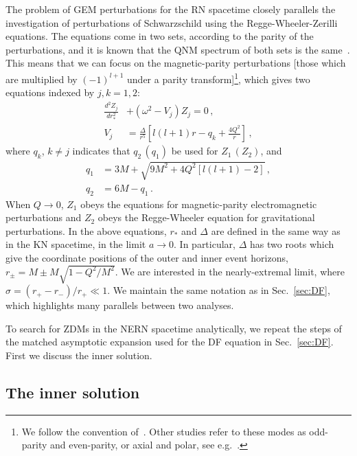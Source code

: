\begin{refsection}
The problem of GEM perturbations for the RN spacetime closely parallels the investigation of perturbations of Schwarzschild using the Regge-Wheeler-Zerilli equations. 
The equations come in two sets, according to the parity of the perturbations, and it is known that the QNM spectrum of both sets is the same~\cite{ChandraBook,Dias:2015wqa}. 
This means that we can focus on the magnetic-parity perturbations [those which are multiplied by $(-1)^{l+1}$ under a parity transform]\footnote{We follow the convention of~\cite{Zerilli:1970wd}. Other studies refer to these modes as odd-parity and even-parity, or axial and polar, see e.g.~\cite{Pani:2013ija,Pani:2013wsa}.}, which gives two equations indexed by $j,k = 1,2$:
\begin{align}
\label{eq:RNwave}
\frac{d^2 Z_j}{dr_*^2}& + (\omega^2 - V_j) Z_j = 0 \,, \\
\label{eq:RNpot}
V_j & = \frac{\Delta}{r^5}\left[ l(l+1) r - q_k +\frac{4 Q^2}{r} \right] \,,
\end{align}
where $q_k$, $k \neq j$ indicates that $q_2\, (q_1)$ be used for $Z_1\, (Z_2)$, and
\begin{align}
q_1 &= 3 M  + \sqrt{9 M^2 +4 Q^2 [l(l+1)-2]} \,, \\
q_2 & = 6M - q_1 \,.
\end{align}
When $Q \to 0$, $Z_1$ obeys the equations for  magnetic-parity electromagnetic perturbations and $Z_2$ obeys the Regge-Wheeler equation for gravitational perturbations. In the above equations, $r_*$ and $\Delta$ are defined in the same way as in the KN spacetime, in the limit $a \to 0$. In particular, $\Delta$ has two roots which give the coordinate positions of the outer and inner event horizons, $r_\pm = M \pm M \sqrt{1 - Q^2/M^2}$.
We are interested in the nearly-extremal limit, where $\sigma = (r_+ - r_-)/r_+ \ll 1$. We maintain the same notation as in Sec.~\ref{sec:DF}, which highlights many parallels between two analyses.

To search for ZDMs in the NERN spacetime analytically, we repeat the steps of the matched asymptotic expansion used for the DF equation in Sec.~\ref{sec:DF}. First we discuss the inner solution.

\subsection{The inner solution}


\end{refsection}

